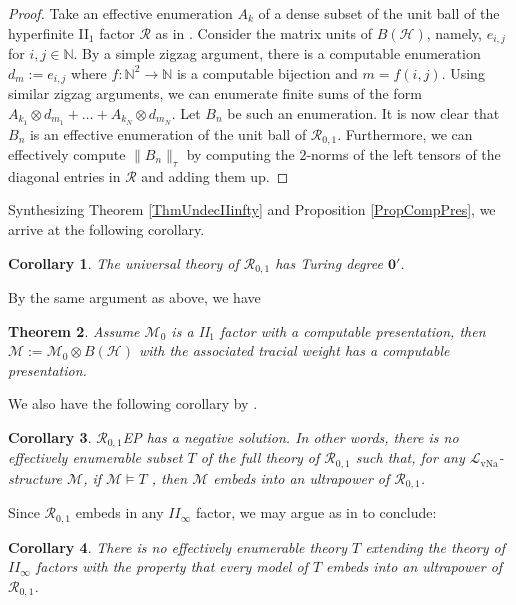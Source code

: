 \documentclass[12pt]{amsart}
\newtheorem{thm}{Theorem}[section]
\newtheorem{cor}[thm]{Corollary}
\theoremstyle{definition}
\def\cal{\mathcal}
\DeclareMathOperator{\vNa}{vNa}
\newcommand\R{{\cal R}}
\def \bbN{\mathbb{N}}
\begin{document}
\begin{proof}
    Take an effective enumeration $A_k$ of a dense subset of the unit ball of the hyperfinite II$_1$ factor $\cal R$ as in \cite[Remark 3.11]{GHHyp}.  Consider the matrix units of $B(\cal H)$, namely, $e_{i,j}$ for $i, j \in \bbN$.  By a simple zigzag argument, there is a computable enumeration $d_{m} := e_{i,j}$ where $f: \bbN^2 \to \bbN$ is a computable bijection and $m = f(i,j)$.  Using similar zigzag arguments, we can enumerate finite sums of the form $A_{k_1} \otimes d_{m_1} + \ldots + A_{k_N} \otimes d_{m_N}$.  Let $B_{n}$ be such an enumeration.  It is now clear that $B_{n}$ is an effective enumeration of the unit ball of $\R_{0,1}$.  Furthermore, we can effectively compute $\|B_n\|_{\tau}$ by computing the $2$-norms of the left tensors of the diagonal entries in $\R$ and adding them up.
\end{proof}

Synthesizing Theorem \ref{ThmUndecIIinfty} and Proposition \ref{PropCompPres}, we arrive at the following corollary.

\begin{cor}
    The universal theory of $\R_{0,1}$ has Turing degree $\mathbf{0}'$.
\end{cor}

By the same argument as above, we have

\begin{thm}
    Assume $\cal M_0$ is a II$_1$ factor with a computable presentation, then $\cal M := \cal M_0 \otimes B(\cal H)$ with the associated tracial weight has a computable presentation.
\end{thm}

We also have the following corollary by \cite[Theorem 5.2]{GH2}.

\begin{cor}
    $\R_{0,1}$EP has a negative solution. In other words, there is no effectively enumerable subset $T$ of the full theory of $\R_{0,1}$ such that, for any $\cal L_{\vNa}$-structure $\cal M$, if $\cal M \vDash T$ , then $\cal M$ embeds into an ultrapower of $\R_{0,1}$.
\end{cor}

Since $\R_{0,1}$ embeds in any $II_{\infty}$ factor, we may argue as in \cite[Remark 5.4]{GH2} to conclude:

\begin{cor}
    There is no effectively enumerable theory $T$ extending the theory of $II_{\infty}$ factors with the property that every model of $T$ embeds into an ultrapower of $\R_{0,1}$.
\end{cor}
\end{document}
